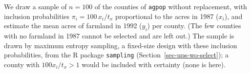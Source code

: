\documentclass[
  letterpaper,
  DIV=11,
  numbers=noendperiod]{scrreprt}
\newenvironment{Shaded}{\begin{snugshade}}{\end{snugshade}}
\newcommand{\AttributeTok}[1]{\textcolor[rgb]{0.40,0.45,0.13}{#1}}
\newcommand{\CommentTok}[1]{\textcolor[rgb]{0.37,0.37,0.37}{#1}}
\newcommand{\DecValTok}[1]{\textcolor[rgb]{0.68,0.00,0.00}{#1}}
\newcommand{\FunctionTok}[1]{\textcolor[rgb]{0.28,0.35,0.67}{#1}}
\newcommand{\NormalTok}[1]{\textcolor[rgb]{0.00,0.23,0.31}{#1}}
\newcommand{\OtherTok}[1]{\textcolor[rgb]{0.00,0.23,0.31}{#1}}
\newcommand{\SpecialCharTok}[1]{\textcolor[rgb]{0.37,0.37,0.37}{#1}}
\newcommand{\StringTok}[1]{\textcolor[rgb]{0.13,0.47,0.30}{#1}}
\newcounter{none} %
\renewcommand{\[}{\begin{equation}}
\renewcommand{\]}{\end{equation}}
\begin{document}
We draw a sample of \(n=100\) of the counties of \texttt{agpop} without
replacement, with inclusion probabilities \(\pi_i=100\,x_i/t_x\)
proportional to the acres in 1987 (\(x_i\)), and estimate the mean acres
of farmland in 1992 (\(y_i\)) per county. (The few counties with no
farmland in 1987 cannot be selected and are left out.) The sample is
drawn by maximum entropy sampling, a fixed-size design with these
inclusion probabilities, from the R package \texttt{sampling}
(Section~\ref{sec-ups-wo-select}); a county with \(100x_i/t_x>1\) would
be included with certainty (none is here).

\begin{Shaded}
\end{Shaded}
\end{document}
